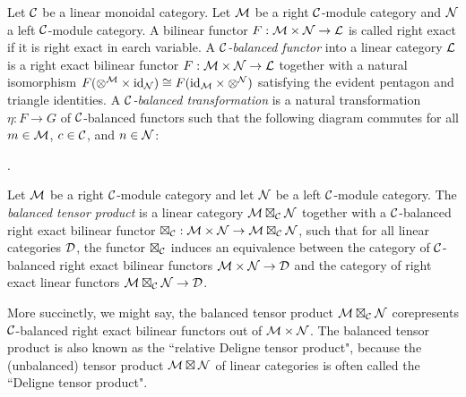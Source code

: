 \documentclass{amsart}
\begin{document}
\begin{definition}
	Let $\mathcal C$ be a linear monoidal category. 
	Let $\mathcal M$ be a right $\mathcal C$-module category and $\mathcal N$ a left $\mathcal C$-module category.  A bilinear functor $F: \mathcal M \times \mathcal N \to \mathcal L$ is called right exact if it is right exact in earch variable.   A {\em $\mathcal C$-balanced functor} into a linear category $\mathcal L$ is a right exact bilinear functor $F: \mathcal M \times \mathcal N \to \mathcal L$ together with a natural isomorphism $F(\otimes^{\mathcal M} \times \mathrm{id}_{\mathcal N}) \cong F(\mathrm{id}_{\mathcal M} \times \otimes^{\mathcal N})$ satisfying the evident pentagon and triangle identities.
	A {\em $\mathcal C$-balanced transformation} is a natural transformation $\eta:F \to G$ of $\mathcal C$-balanced functors such that the following diagram commutes for all $m \in \mathcal M$, $c \in \mathcal C$, and $n \in \mathcal N$:
\begin{center}
.
\end{center}
\end{definition}

\begin{definition}
	Let $\mathcal M$ be a right $\mathcal C$-module category and let $\mathcal N$ be a left $\mathcal C$-module category. The {\em balanced tensor product} is a linear category $\mathcal M \boxtimes_{\mathcal C} \mathcal N$
	 together with a $\mathcal C$-balanced right exact bilinear functor $\boxtimes_{\mathcal C} : \mathcal M \times \mathcal N \to \mathcal M \boxtimes_{\mathcal C} \mathcal N$, such that for all linear categories $\mathcal D$, the functor $\boxtimes_{\mathcal C}$ induces an equivalence between the category of $\mathcal C$-balanced right exact bilinear functors $\mathcal M \times \mathcal N \to \mathcal D$ and the category of right exact linear functors $\mathcal M \boxtimes_{\mathcal C} \mathcal N \to \mathcal D$. 
\end{definition}
\nid More succinctly, we might say, the balanced tensor product $\mathcal M \boxtimes_{\mathcal C} \mathcal N$ corepresents $\mathcal C$-balanced right exact bilinear functors out of $\mathcal M \times \mathcal N$.  The balanced tensor product is also known as the ``relative Deligne tensor product", because the (unbalanced) tensor product $\mathcal M \boxtimes \mathcal N$ of linear categories is often called the ``Deligne tensor product".  
\end{document}
